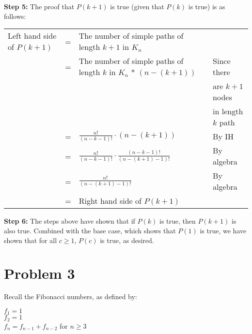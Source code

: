 \documentclass{article}
\begin{document}
\textbf{Step 5:} The proof that $P(k+1)$ is true (given that $P(k)$ is true) is as follows:\vspace{15pt}


\begin{adjustwidth}{-1.5cm}{}
	\begin{sloppypar}
		\begin{tabular}{l l l l}
			Left hand side of $P(k+1)$ & = & The number of simple paths of length $k+1$ in $K_n$ & \\
									   & = & The number of simple paths of length $k$ in $K_n$ * $(n-(k+1))$ & Since there \\
									   &  & & are $k+1$ nodes \\
									   & & & in length $k$ path \\
									   & = & $\frac{n!}{(n-k-1)!}\cdot (n-(k+1))$ & By IH \\
									   & = & $\frac{n!}{(n-k-1)!}\cdot \frac{(n-k-1)!}{(n-(k+1)-1)!}$ & By algebra \\
									   & = & $\frac{n!}{(n-(k+1)-1)!}$ & By algebra \\
									   & = & Right hand side of $P(k+1)$ & \\
		\end{tabular}
	\end{sloppypar}
\end{adjustwidth}
\vspace{15pt}

\textbf{Step 6:} The steps above have shown that if $P(k)$ is true, then $P(k+1)$ is also true. Combined with the base case, which shows that $P(1)$ is true, we have shown that for all $c\geq 1$, $P(c)$ is true, as desired.



\pagebreak

\section{Problem 3}

Recall the Fibonacci numbers, as defined by:
\begin{center}
    \begin{minipage}{0.5\textwidth} %
        \raggedright %
        $f_1=1$ \\
        $f_2=1$ \\
        $f_n=f_{n-1}+f_{n-2}$ for $n\geq 3$
    \end{minipage}
\end{center}
\vspace{10pt}
\end{document}
